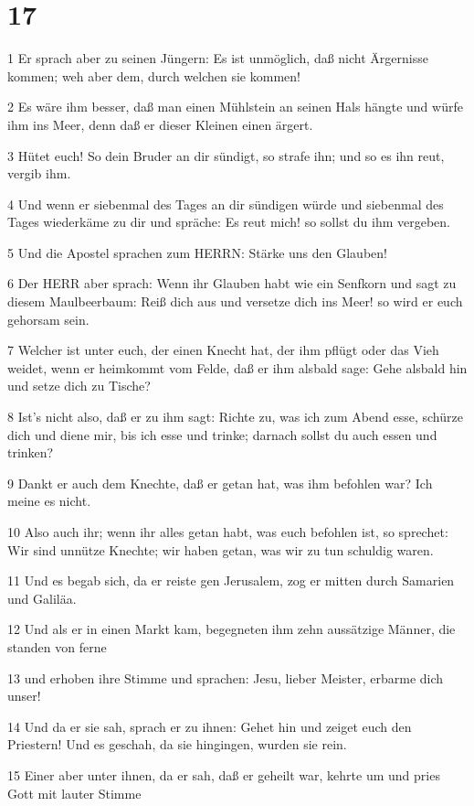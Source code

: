 \chapter{17}

\par 1 Er sprach aber zu seinen Jüngern: Es ist unmöglich, daß nicht Ärgernisse kommen; weh aber dem, durch welchen sie kommen!
\par 2 Es wäre ihm besser, daß man einen Mühlstein an seinen Hals hängte und würfe ihm ins Meer, denn daß er dieser Kleinen einen ärgert.
\par 3 Hütet euch! So dein Bruder an dir sündigt, so strafe ihn; und so es ihn reut, vergib ihm.
\par 4 Und wenn er siebenmal des Tages an dir sündigen würde und siebenmal des Tages wiederkäme zu dir und spräche: Es reut mich! so sollst du ihm vergeben.
\par 5 Und die Apostel sprachen zum HERRN: Stärke uns den Glauben!
\par 6 Der HERR aber sprach: Wenn ihr Glauben habt wie ein Senfkorn und sagt zu diesem Maulbeerbaum: Reiß dich aus und versetze dich ins Meer! so wird er euch gehorsam sein.
\par 7 Welcher ist unter euch, der einen Knecht hat, der ihm pflügt oder das Vieh weidet, wenn er heimkommt vom Felde, daß er ihm alsbald sage: Gehe alsbald hin und setze dich zu Tische?
\par 8 Ist's nicht also, daß er zu ihm sagt: Richte zu, was ich zum Abend esse, schürze dich und diene mir, bis ich esse und trinke; darnach sollst du auch essen und trinken?
\par 9 Dankt er auch dem Knechte, daß er getan hat, was ihm befohlen war? Ich meine es nicht.
\par 10 Also auch ihr; wenn ihr alles getan habt, was euch befohlen ist, so sprechet: Wir sind unnütze Knechte; wir haben getan, was wir zu tun schuldig waren.
\par 11 Und es begab sich, da er reiste gen Jerusalem, zog er mitten durch Samarien und Galiläa.
\par 12 Und als er in einen Markt kam, begegneten ihm zehn aussätzige Männer, die standen von ferne
\par 13 und erhoben ihre Stimme und sprachen: Jesu, lieber Meister, erbarme dich unser!
\par 14 Und da er sie sah, sprach er zu ihnen: Gehet hin und zeiget euch den Priestern! Und es geschah, da sie hingingen, wurden sie rein.
\par 15 Einer aber unter ihnen, da er sah, daß er geheilt war, kehrte um und pries Gott mit lauter Stimme
